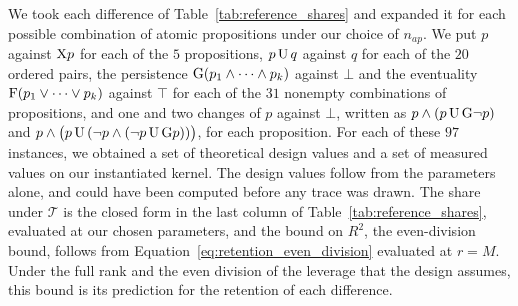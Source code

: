 \documentclass[titlepage,a4paper,11pt]{report}
\begin{document}
    We took each difference of Table~\ref{tab:reference_shares} and expanded it for each possible combination of atomic propositions under our choice of $n_{ap}$. We put $p$ against $\text{X} p$ for each of the $5$ propositions, $p\,\text{U}\,q$ against $q$ for each of the $20$ ordered pairs, the persistence $\text{G}(p_1\land\dots\land p_k)$ against $\bot$ and the eventuality $\text{F}(p_1\lor\dots\lor p_k)$ against $\top$ for each of the $31$ nonempty combinations of propositions, and one and two changes of $p$ against $\bot$, written as $p\land(p\,\text{U}\,\text{G}\neg p)$ and $p\land\bigl(p\,\text{U}\,(\neg p\land(\neg p\,\text{U}\,\text{G} p))\bigr)$, for each proposition. For each of these $97$ instances, we obtained a set of theoretical design values and a set of measured values on our instantiated kernel. The design values follow from the parameters alone, and could have been computed before any trace was drawn. The share under $\mathcal T$ is the closed form in the last column of Table~\ref{tab:reference_shares}, evaluated at our chosen parameters, and the bound on $R^2$, the even-division bound, follows from Equation~\eqref{eq:retention_even_division} evaluated at $r=M$. Under the full rank and the even division of the leverage that the design assumes, this bound is its prediction for the retention of each difference.
\end{document}
